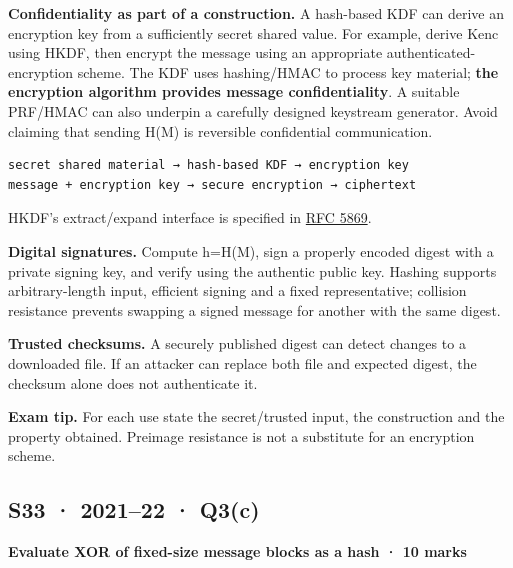 \documentclass[11pt,a4paper]{article}
\begin{document}
\textbf{Confidentiality as part of a construction.} A hash-based KDF can derive an encryption key from a sufficiently secret shared value. For example,\allowbreak{} derive Kenc using HKDF,\allowbreak{} then encrypt the message using an appropriate authenticated-encryption scheme. The KDF uses hashing/\allowbreak{}HMAC to process key material; \textbf{the encryption algorithm provides message confidentiality}. A suitable PRF/\allowbreak{}HMAC can also underpin a carefully designed keystream generator. Avoid claiming that sending H(M) is reversible confidential communication.



\begin{Verbatim}[breaklines=true,breakanywhere=true,fontsize=\small,frame=single,rulecolor=\color{PanelBorder}]
secret shared material → hash-based KDF → encryption key
message + encryption key → secure encryption → ciphertext
\end{Verbatim}

HKDF’s extract/\allowbreak{}expand interface is specified in \href{https://www.rfc-editor.org/rfc/rfc5869}{RFC 5869}.


\textbf{Digital signatures.} Compute h=\allowbreak{}H(M),\allowbreak{} sign a properly encoded digest with a private signing key,\allowbreak{} and verify using the authentic public key. Hashing supports arbitrary-length input,\allowbreak{} efficient signing and a fixed representative; collision resistance prevents swapping a signed message for another with the same digest.


\textbf{Trusted checksums.} A securely published digest can detect changes to a downloaded file. If an attacker can replace both file and expected digest,\allowbreak{} the checksum alone does not authenticate it.



{\color{ForestGreen}\textbf{Exam tip.} For each use state the secret/\allowbreak{}trusted input,\allowbreak{} the construction and the property obtained. Preimage resistance is not a substitute for an encryption scheme.}




\clearpage
\subsection{S33 · 2021–22 · Q3(c)}\label{s33}

\textbf{Evaluate XOR of fixed-size message blocks as a hash · 10 marks}
\end{document}

